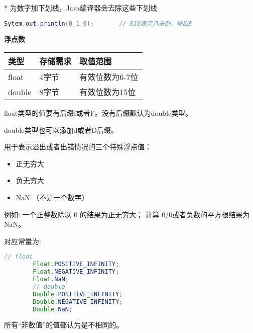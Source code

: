 * 为数字加下划线，Java编译器会去除这些下划线

\begin{lstlisting}[language=java]
        Sytem.out.println(0_1_0);       // 010表示八进制，输出8
\end{lstlisting}




\textbf{浮点数}


\renewcommand\arraystretch{2}
\begin{tabular}{l|l|l}
    类型         &      存储需求        &     取值范围        \\               \hline
    float        &       4字节          & 有效位数为6-7位      \\
    double      &       8字节          & 有效位数为15位       \\
\end{tabular}\newline


float类型的值要有后缀f或者F。没有后缀默认为double类型。

double类型也可以添加d或者D后缀。


用于表示溢出或者出错情况的三个特殊浮点值：

\begin{itemize}
        \item   正无穷大  
        \item   负无穷大
        \item   NaN （不是一个数字）
\end{itemize}

例如: 一个正整数除以 0 的结果为正无穷大； 计算 0/0或者负数的平方根结果为NaN。

对应常量为:
\begin{lstlisting}[language=java]
        // float
        Float.POSITIVE_INFINITY;
        Float.NEGATIVE_INFINITY;
        Float.NaN;
        // double
        Double.POSITIVE_INFINITY;
        Double.NEGATIVE_INFINITY;
        Double.NaN;
\end{lstlisting}


所有“非数值”的值都认为是不相同的。


